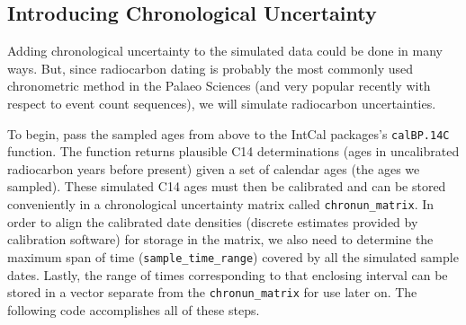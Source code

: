 \documentclass[]{article}
\begin{document}
\subsection{Introducing Chronological
Uncertainty}\label{introducing-chronological-uncertainty}

Adding chronological uncertainty to the simulated data could be done in
many ways. But, since radiocarbon dating is probably the most commonly
used chronometric method in the Palaeo Sciences (and very popular
recently with respect to event count sequences), we will simulate
radiocarbon uncertainties.

To begin, pass the sampled ages from above to the IntCal packages's
\texttt{calBP.14C} function. The function returns plausible C14
determinations (ages in uncalibrated radiocarbon years before present)
given a set of calendar ages (the ages we sampled). These simulated C14
ages must then be calibrated and can be stored conveniently in a
chronological uncertainty matrix called \texttt{chronun\_matrix}. In
order to align the calibrated date densities (discrete estimates
provided by calibration software) for storage in the matrix, we also
need to determine the maximum span of time
(\texttt{sample\_time\_range}) covered by all the simulated sample
dates. Lastly, the range of times corresponding to that enclosing
interval can be stored in a vector separate from the
\texttt{chronun\_matrix} for use later on. The following code
accomplishes all of these steps.
\end{document}
